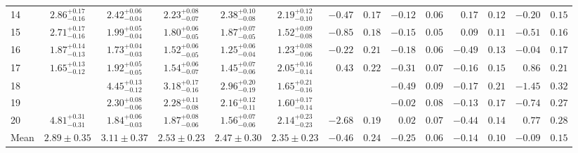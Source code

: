 \begin{tabular}{@{}l ccccc r@{ $\pm$ }l r@{ $\pm$ }l r@{ $\pm$ }l r@{ $\pm$ }l @{}}
\cmidrule{1-14}
14 & ${2.86}^{+0.17}_{-0.16}$ & ${2.42}^{+0.06}_{-0.04}$ & ${2.23}^{+0.08}_{-0.07}$ & ${2.38}^{+0.10}_{-0.08}$ & ${2.19}^{+0.12}_{-0.10}$
  & $-0.47$ & $0.17$ & $-0.12$ & $0.06$ & $0.17$ & $0.12$ & $-0.20$ & $0.15$ \\ [0.5em]
15 & ${2.71}^{+0.17}_{-0.16}$ & ${1.99}^{+0.05}_{-0.04}$ & ${1.80}^{+0.06}_{-0.05}$ & ${1.87}^{+0.07}_{-0.05}$ & ${1.52}^{+0.09}_{-0.08}$
  & $-0.85$ & $0.18$ & $-0.15$ & $0.05$ & $0.09$ & $0.11$ & $-0.51$ & $0.16$ \\ [0.5em]
16 & ${1.87}^{+0.14}_{-0.13}$ & ${1.73}^{+0.04}_{-0.03}$ & ${1.52}^{+0.06}_{-0.05}$ & ${1.25}^{+0.06}_{-0.04}$ & ${1.23}^{+0.08}_{-0.06}$
  & $-0.22$ & $0.21$ & $-0.18$ & $0.06$ & $-0.49$ & $0.13$ & $-0.04$ & $0.17$ \\ [0.5em]
17 & ${1.65}^{+0.13}_{-0.12}$ & ${1.92}^{+0.05}_{-0.05}$ & ${1.54}^{+0.06}_{-0.07}$ & ${1.45}^{+0.07}_{-0.06}$ & ${2.05}^{+0.16}_{-0.14}$
  & $0.43$ & $0.22$ & $-0.31$ & $0.07$ & $-0.16$ & $0.15$ & $0.86$ & $0.21$ \\

\cmidrule{1-14}
18 & {} & ${4.45}^{+0.13}_{-0.12}$ & ${3.18}^{+0.17}_{-0.16}$ & ${2.96}^{+0.20}_{-0.19}$ & ${1.65}^{+0.21}_{-0.16}$
  & \multicolumn{2}{c}{} & $-0.49$ & $0.09$ & $-0.17$ & $0.21$ & $-1.45$ & $0.32$ \\ [0.5em]
19 & {} & ${2.30}^{+0.08}_{-0.06}$ & ${2.28}^{+0.11}_{-0.08}$ & ${2.16}^{+0.12}_{-0.11}$ & ${1.60}^{+0.17}_{-0.14}$
  & \multicolumn{2}{c}{} & $-0.02$ & $0.08$ & $-0.13$ & $0.17$ & $-0.74$ & $0.27$ \\ [0.5em]
20 & ${4.81}^{+0.31}_{-0.31}$ & ${1.84}^{+0.06}_{-0.03}$ & ${1.87}^{+0.08}_{-0.06}$ & ${1.56}^{+0.07}_{-0.06}$ & ${2.14}^{+0.23}_{-0.23}$
  & $-2.68$ & $0.19$ & $0.02$ & $0.07$ & $-0.44$ & $0.14$ & $0.77$ & $0.28$ \\

\midrule
Mean & $2.89 \pm 0.35$ & $3.11 \pm 0.37$ & $2.53 \pm 0.23$ & $2.47 \pm 0.30$ & $2.35 \pm 0.23$
  & $-0.46$ & $0.24$ & $-0.25$ & $0.06$ & $-0.14$ & $0.10$ & $-0.09$ & $0.15$ \\

\bottomrule
\end{tabular}
